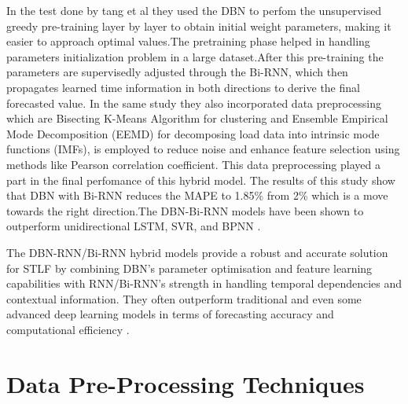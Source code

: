  
 In the test done by tang et al \cite{tang2019application} they used the DBN to perfom the unsupervised greedy pre-training layer by layer to obtain initial weight parameters, making it easier to approach optimal values.The pretraining phase helped in handling parameters initialization problem in a large dataset.After this pre-training the parameters are supervisedly adjusted through the Bi-RNN, which then propagates learned time information in both directions to derive the final forecasted value. In the same study they also incorporated data preprocessing which are Bisecting K-Means Algorithm for clustering and Ensemble Empirical Mode Decomposition (EEMD) for decomposing load data into intrinsic mode functions (IMFs), is employed to reduce noise and enhance feature selection using methods like Pearson correlation coefficient. This data preprocessing played a part in the final perfomance of this hybrid model.
 The results of this study show that DBN with Bi-RNN reduces the MAPE to 1.85\% from 2\% which is a move towards the right direction.The  DBN-Bi-RNN models have been shown to outperform unidirectional LSTM, SVR, and BPNN \cite{tang2019application}.
 
 The DBN-RNN/Bi-RNN hybrid models provide a robust and accurate solution for STLF by combining DBN's parameter optimisation and feature learning capabilities with RNN/Bi-RNN's strength in handling temporal dependencies and contextual information. They often outperform traditional and even some advanced deep learning models in terms of forecasting accuracy and computational efficiency \cite{dong2021short}.
 
 
 
 \section{Data Pre-Processing Techniques}
 
 

